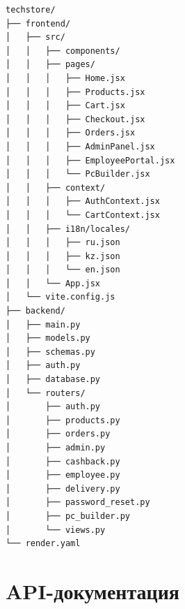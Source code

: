 \documentclass[14pt,a4paper]{extreport}
\begin{document}
\begin{lstlisting}[language={}, caption={Файловая структура TechStore}]
techstore/
├── frontend/
│   ├── src/
│   │   ├── components/
│   │   ├── pages/
│   │   │   ├── Home.jsx
│   │   │   ├── Products.jsx
│   │   │   ├── Cart.jsx
│   │   │   ├── Checkout.jsx
│   │   │   ├── Orders.jsx
│   │   │   ├── AdminPanel.jsx
│   │   │   ├── EmployeePortal.jsx
│   │   │   └── PcBuilder.jsx
│   │   ├── context/
│   │   │   ├── AuthContext.jsx
│   │   │   └── CartContext.jsx
│   │   ├── i18n/locales/
│   │   │   ├── ru.json
│   │   │   ├── kz.json
│   │   │   └── en.json
│   │   └── App.jsx
│   └── vite.config.js
├── backend/
│   ├── main.py
│   ├── models.py
│   ├── schemas.py
│   ├── auth.py
│   ├── database.py
│   └── routers/
│       ├── auth.py
│       ├── products.py
│       ├── orders.py
│       ├── admin.py
│       ├── cashback.py
│       ├── employee.py
│       ├── delivery.py
│       ├── password_reset.py
│       ├── pc_builder.py
│       └── views.py
└── render.yaml
\end{lstlisting}

\chapter{API-документация}
\end{document}
